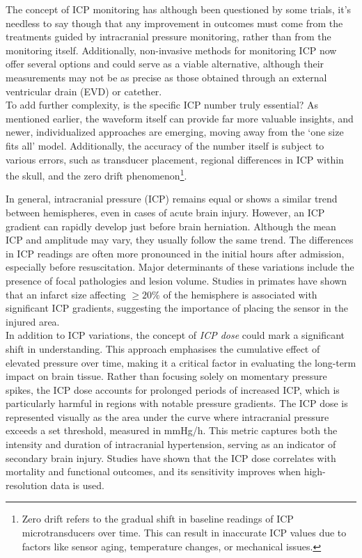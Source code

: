 The concept of  ICP monitoring has although been questioned by some trials, it's needless to say though that any improvement in outcomes must come from the treatments guided by intracranial pressure monitoring, rather than from the monitoring itself\cite{stocchettiTraumaticIntracranialHypertension2014a}. Additionally, non-invasive methods for monitoring ICP now offer several options and could serve as a viable alternative, although their measurements may not be as precise as those obtained through an external ventricular drain (EVD) or catether.\\

To add further complexity, is the specific ICP number truly essential? As mentioned earlier, the waveform itself can provide far more valuable insights, and newer, individualized approaches are emerging, moving away from the ‘one size fits all’ model. Additionally, the accuracy of the number itself is subject to various errors, such as transducer placement, regional differences in ICP within the skull, and the zero drift phenomenon\footnote {Zero drift refers to the gradual shift in baseline readings of ICP microtransducers over time. This can result in inaccurate ICP values due to factors like sensor aging, temperature changes, or mechanical issues.\cite{liZeroDriftIntraventricular2015}}.

In general, intracranial pressure (ICP) remains equal or shows a similar trend between hemispheres, even in cases of acute brain injury. However, an ICP gradient can rapidly develop just before brain herniation. Although the mean ICP and amplitude may vary, they usually follow the same trend. The differences in ICP readings are often more pronounced in the initial hours after admission, especially before resuscitation. Major determinants of these variations include the presence of focal pathologies and lesion volume. Studies in primates have shown that an infarct size affecting $\geq 20\%$ of the hemisphere is associated with significant ICP gradients, suggesting the importance of placing the sensor in the injured area\cite{dambrosioInterhemisphericIntracranialPressure2002}.\\


In addition to ICP variations, the concept of \textit {ICP dose} could mark a significant shift in understanding. This approach emphasises the cumulative effect of elevated pressure over time, making it a critical factor in evaluating the long-term impact on brain tissue. Rather than focusing solely on momentary pressure spikes, the ICP dose accounts for prolonged periods of increased ICP, which is particularly harmful in regions with notable pressure gradients.
The ICP dose is represented visually as the area under the curve where intracranial pressure exceeds a set threshold, measured in mmHg/h. This metric captures both the intensity and duration of intracranial hypertension, serving as an indicator of secondary brain injury. Studies have shown that the ICP dose correlates with mortality and functional outcomes, and its sensitivity improves when high-resolution data is used\cite{schonenberg-tuPressureTimeDose2023}.\\

